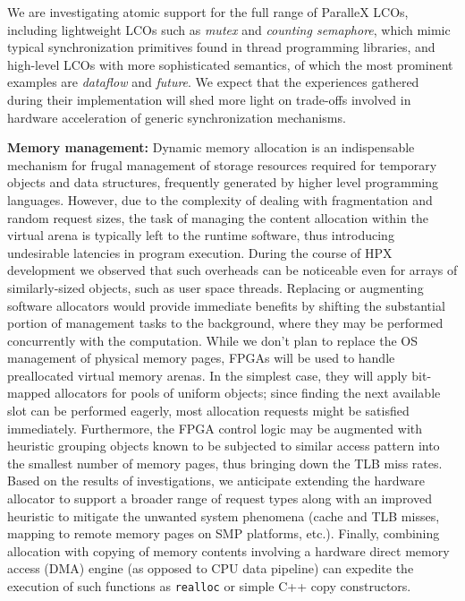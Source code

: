 \documentclass{revtex4}
\newcommand{\B}[1]{\textbf{#1}}
\begin{document}
We are investigating atomic support for the full range of ParalleX LCOs,
including lightweight LCOs such as {\it mutex} and {\it counting
semaphore}, which mimic typical synchronization primitives found
in thread programming libraries, and high-level LCOs with more 
sophisticated semantics, of which the most prominent examples are
{\it dataflow} and {\it future}.
We expect that the experiences gathered during their implementation will
shed more light on trade-offs involved in hardware acceleration of generic
synchronization mechanisms.

\B{Memory management:}
Dynamic memory allocation is an indispensable mechanism for frugal
management of storage resources required for temporary objects and
data structures, frequently generated by higher level programming
languages.
However, due to the complexity of dealing with fragmentation and
random request sizes, the task of managing the content allocation
within the virtual arena is typically left to the runtime software,
thus introducing undesirable latencies in program execution.
During the course of HPX development we observed that such overheads can
be noticeable even for arrays of similarly-sized objects, such as
user space threads.
Replacing or augmenting software allocators would provide immediate
benefits by shifting the substantial portion of management tasks to the
background, where they may be performed concurrently with the computation.
While we don't plan to replace the OS management of physical memory pages,
FPGAs will be used to handle preallocated virtual memory arenas.
In the simplest case, they will apply bit-mapped allocators for pools
of uniform objects; since finding the next available slot can be performed
eagerly, most allocation requests might be satisfied immediately.
Furthermore, the FPGA control logic may be augmented with heuristic grouping
objects known to be subjected to similar access pattern into the smallest
number of memory pages, thus bringing down the TLB miss rates.
Based on the results of investigations, 
we anticipate extending the hardware allocator to support a
broader range of request types along with an improved heuristic to
mitigate the unwanted system phenomena (cache and TLB misses, mapping to
remote memory pages on SMP platforms, etc.).
Finally, combining allocation with copying of memory contents involving a
hardware direct memory access (DMA) engine (as opposed to CPU data pipeline) can expedite the
execution of such functions as {\tt realloc} or simple C++ copy
constructors.
\end{document}
